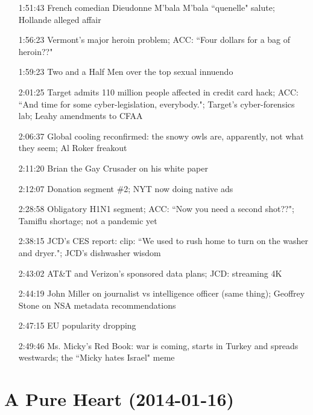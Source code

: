 \documentclass{report}
\newcommand{\mono}[1]{{\fontspec{Courier}#1}}
\begin{document}
\begin{itemize}
\item[\mono{1:51:43}] French comedian Dieudonne M'bala M'bala ``quenelle" salute; Hollande alleged affair
\item[\mono{1:56:23}] Vermont's major heroin problem; ACC: ``Four dollars for a bag of heroin??"
\item[\mono{1:59:23}] Two and a Half Men over the top sexual innuendo
\item[\mono{2:01:25}] Target admits 110 million people affected in credit card hack; ACC: ``And time for some cyber-legislation, everybody."; Target's cyber-forensics lab; Leahy amendments to CFAA
\item[\mono{2:06:37}] Global cooling reconfirmed: the snowy owls are, apparently, not what they seem; Al Roker freakout
\item[\mono{2:11:20}] Brian the Gay Crusader on his white paper
\item[\mono{2:12:07}] Donation segment \#2; NYT now doing native ads
\item[\mono{2:28:58}] Obligatory H1N1 segment; ACC: ``Now you need a second shot??"; Tamiflu shortage; not a pandemic yet
\item[\mono{2:38:15}] JCD's CES report: clip: ``We used to rush home to turn on the washer and dryer."; JCD's dishwasher wisdom
\item[\mono{2:43:02}] AT\&T and Verizon's sponsored data plans; JCD: streaming 4K
\item[\mono{2:44:19}] John Miller on journalist vs intelligence officer (same thing); Geoffrey Stone on NSA metadata recommendations
\item[\mono{2:47:15}] EU popularity dropping
\item[\mono{2:49:46}] Ms. Micky's Red Book: war is coming, starts in Turkey and spreads westwards; the ``Micky hates Israel" meme
\end{itemize}
\setcounter{section}{583}\section[A Pure Heart]{A Pure Heart \small{(2014-01-16)}}
\end{document}

